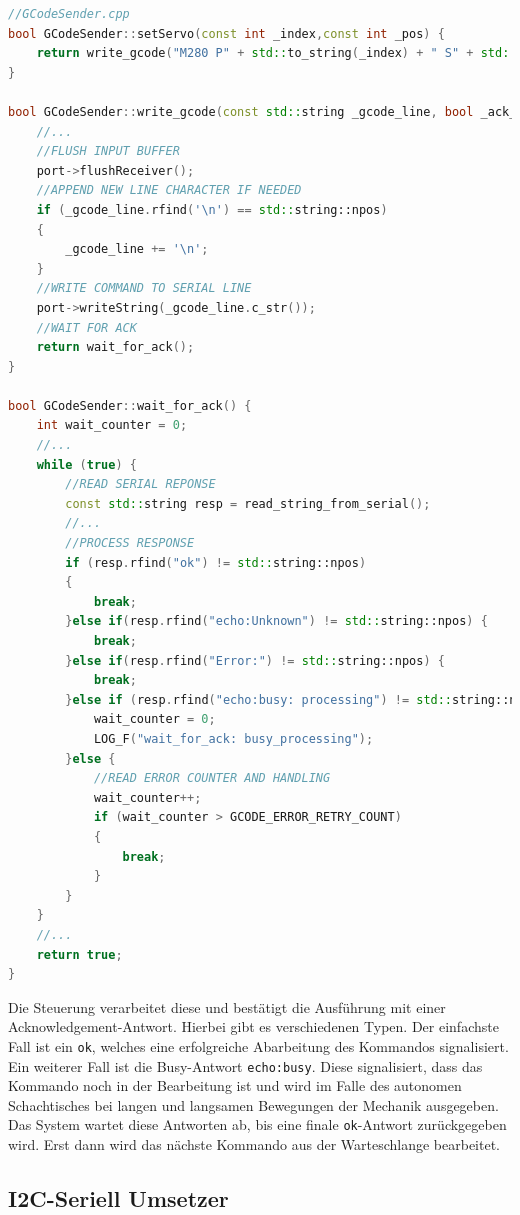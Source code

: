 \begin{lstlisting}[language={C++}]
//GCodeSender.cpp
bool GCodeSender::setServo(const int _index,const int _pos) {
    return write_gcode("M280 P" + std::to_string(_index) + " S" + std::to_string(_pos));
}

bool GCodeSender::write_gcode(const std::string _gcode_line, bool _ack_check) {
    //...
    //FLUSH INPUT BUFFER
    port->flushReceiver();
    //APPEND NEW LINE CHARACTER IF NEEDED
    if (_gcode_line.rfind('\n') == std::string::npos)
    {
        _gcode_line += '\n';
    }
    //WRITE COMMAND TO SERIAL LINE
    port->writeString(_gcode_line.c_str());
    //WAIT FOR ACK
    return wait_for_ack();
}

bool GCodeSender::wait_for_ack() {
    int wait_counter = 0;
    //...
    while (true) {
        //READ SERIAL REPONSE
        const std::string resp = read_string_from_serial();
        //...
        //PROCESS RESPONSE
        if (resp.rfind("ok") != std::string::npos)
        {
            break;
        }else if(resp.rfind("echo:Unknown") != std::string::npos) {
            break;
        }else if(resp.rfind("Error:") != std::string::npos) {
            break;
        }else if (resp.rfind("echo:busy: processing") != std::string::npos) {
            wait_counter = 0;
            LOG_F("wait_for_ack: busy_processing");
        }else {
            //READ ERROR COUNTER AND HANDLING
            wait_counter++;
            if (wait_counter > GCODE_ERROR_RETRY_COUNT)
            {
                break;
            }
        }
    }
    //...
    return true;
}
\end{lstlisting}

Die Steuerung verarbeitet diese und bestätigt die Ausführung mit einer
Acknowledgement-Antwort. Hierbei gibt es verschiedenen Typen. Der
einfachste Fall ist ein \passthrough{\lstinline!ok!}, welches eine
erfolgreiche Abarbeitung des Kommandos signalisiert. Ein weiterer Fall
ist die Busy-Antwort \passthrough{\lstinline!echo:busy!}. Diese
signalisiert, dass das Kommando noch in der Bearbeitung ist und wird im
Falle des autonomen Schachtisches bei langen und langsamen Bewegungen
der Mechanik ausgegeben. Das System wartet diese Antworten ab, bis eine
finale \passthrough{\lstinline!ok!}-Antwort zurückgegeben wird. Erst
dann wird das nächste Kommando aus der Warteschlange bearbeitet.

\hypertarget{i2c-seriell-umsetzer}{%
\subsection{I2C-Seriell Umsetzer}\label{i2c-seriell-umsetzer}}

